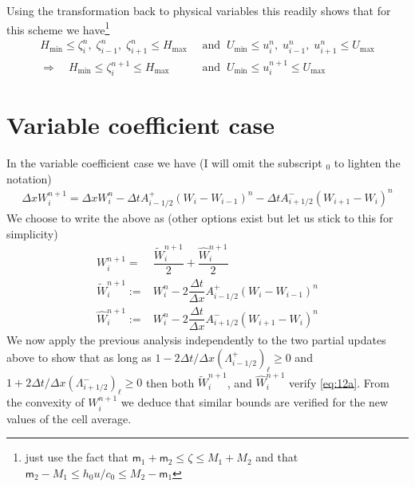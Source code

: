 \documentclass[10pt]{article}
\begin{document}
Using the transformation back to physical variables this readily shows that  for this scheme we have\footnote{just use the fact that $\textsf{m}_1+\textsf{m}_2\le \zeta\le M_1+M_2$ and that $\textsf{m}_2-M_1\le h_0u/c_0 \le M_2-\textsf{m}_1$  }  
 \begin{equation}\label{eq:12a}\begin{split}
H_{\min}  \le \zeta_i^n,\; \zeta_{i-1}^n,\; \zeta_{i+1}^n \le H_{\max} 
\;\;&\text{and}\;\;
U_{\min} \le  u^n_i,\; u_{i-1}^n,\; u_{i+1}^n \le  U_{\max}\\
\Rightarrow \quad
H_{\min}  \le \zeta_i^{n+1}  \le H_{\max} 
\;\;&\text{and}\;\;
U_{\min} \le  u^{n+1}_i \le  U_{\max}
\end{split}\end{equation}

 \section{Variable coefficient case} 
 In the variable coefficient case we  have (I will omit the  subscript $_0$ to lighten the notation)
  \begin{equation}\label{eq:13}
\begin{split}
\Delta xW_i^{n+1} =\Delta x W_i^n - \Delta t    A_{i-1/2}^+(W_i -W_{i-1} )^n
- \Delta t    A_{i+1/2}^-(W_{i+1} -W_{i} )^n
 \end{split}
\end{equation}
We choose to write the above as (other options exist but let us stick to this for simplicity)
  \begin{equation}\label{eq:14}
\begin{split}
W_i^{n+1}  = &\dfrac{\tilde{W}_i^{n+1} }{2} +\dfrac{\hat{W}_i^{n+1} }{2} \\
\tilde{W}_i^{n+1}:= &   W_i^n - 2\dfrac{ \Delta t}{\Delta x}    A_{i-1/2}^+(W_i -W_{i-1} )^n \\
\hat{W}_i^{n+1} := & W_i^n - 2\dfrac{ \Delta t}{\Delta x}  A_{i+1/2}^-(W_{i+1} -W_{i} )^n
 \end{split}
\end{equation}
We now apply the previous analysis independently to the two partial updates above to show that as long as 
$1 - 2\Delta t/\Delta x  (\Lambda_{i-1/2}^+)_{\ell} \ge 0$ and  $1 +2\Delta t /\Delta x (\Lambda_{i+1/2}^-)_{\ell}  \ge 0$
then both $\tilde{W}_i^{n+1}$, and 
$\hat{W}_i^{n+1}$ verify  \eqref{eq:12a}. From the convexity of $W_i^{n+1}$ we deduce that similar bounds are verified
for the new values of the cell average.
\end{document}
